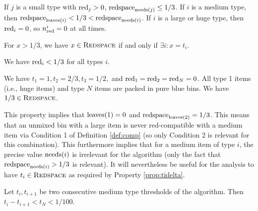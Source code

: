\begin{aproperty}
	\label{prop:redspace}
	If $j$ is a small type with $\mathrm{red}_j>0$, $\mathrm{redspace}_{\mathrm{needs}(j)} \le 1/3$.
	If $i$ is a medium type, then
	$\mathrm{redspace}_{\mathrm{leaves}(i)} < 1/3 < \mathrm{redspace}_{\mathrm{needs}(i)}$. If $i$ is a large or huge type, then $\mathrm{red}_i=0$, so $n_{\mathrm{red}}^i=0$ at all times.
\end{aproperty}
\begin{aproperty}
	\label{prop:tidelta}
	For $x>1/3$, we have $x\in\mbox{\textsc{Redspace}}$ if and only if $\exists i: x=t_i$.
\end{aproperty}


\begin{aproperty}
	\label{prop:redfrac}
	We have $\mathrm{red}_i < 1/3$ for all types $i$.
\end{aproperty}


\begin{aproperty}
	\label{prop:type12N}
	We have $t_1=1, t_2=2/3, t_3=1/2,$ and $\mathrm{red}_1=\mathrm{red}_2=\mathrm{red}_N=0$.
	All type 1 items (i.e., huge items) and type $N$ items are packed in pure blue bins.
	We have $1/3\in\mbox{\textsc{Redspace}}$.
\end{aproperty}

This property implies that $\mathrm{leaves}(1)=0$ and $\mathrm{redspace}_{\mathrm{leaves}(2)}=1/3$.
This means that an unmixed bin with a large item is never red-compatible
with a medium item via Condition 1 of Definition \ref{def:comp}
(so only Condition 2 is relevant for this combination).
This furthermore implies that for a medium item of type $i$, the precise value
$\mathrm{needs}(i)$ is irrelevant for the algorithm (only the fact that $\mathrm{redspace}_{\mathrm{needs}(i)}>1/3$ is relevant).
It will nevertheless be useful for the analysis to have $t_i\in\mbox{\textsc{Redspace}}$
as required by Property \ref{prop:tidelta}.

\begin{aproperty}\label{prop:q1unique}
	Let $t_i, t_{i+1}$ be two consecutive medium type thresholds of the algorithm. Then $t_i-t_{i+1}<t_N<1/100$.
\end{aproperty}

